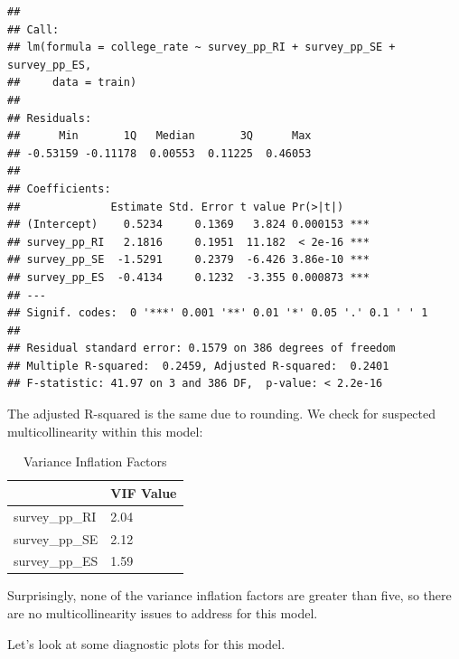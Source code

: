 \documentclass[
  man,floatsintext]{apa6}
\begin{document}
\begin{verbatim}
## 
## Call:
## lm(formula = college_rate ~ survey_pp_RI + survey_pp_SE + survey_pp_ES, 
##     data = train)
## 
## Residuals:
##      Min       1Q   Median       3Q      Max 
## -0.53159 -0.11178  0.00553  0.11225  0.46053 
## 
## Coefficients:
##              Estimate Std. Error t value Pr(>|t|)    
## (Intercept)    0.5234     0.1369   3.824 0.000153 ***
## survey_pp_RI   2.1816     0.1951  11.182  < 2e-16 ***
## survey_pp_SE  -1.5291     0.2379  -6.426 3.86e-10 ***
## survey_pp_ES  -0.4134     0.1232  -3.355 0.000873 ***
## ---
## Signif. codes:  0 '***' 0.001 '**' 0.01 '*' 0.05 '.' 0.1 ' ' 1
## 
## Residual standard error: 0.1579 on 386 degrees of freedom
## Multiple R-squared:  0.2459, Adjusted R-squared:  0.2401 
## F-statistic: 41.97 on 3 and 386 DF,  p-value: < 2.2e-16
\end{verbatim}

The adjusted R-squared is the same due to rounding. We check for suspected multicollinearity within this model:

\begin{table}[H]

\begin{center}
\begin{threeparttable}

\caption{\label{tab:base-rating-model-vif-check}Variance Inflation Factors}

\begin{tabular}{ll}
\toprule
 & \multicolumn{1}{c}{VIF Value}\\
\midrule
survey\_pp\_RI & 2.04\\
survey\_pp\_SE & 2.12\\
survey\_pp\_ES & 1.59\\
\bottomrule
\end{tabular}

\end{threeparttable}
\end{center}

\end{table}

Surprisingly, none of the variance inflation factors are greater than five, so there are no multicollinearity issues to address for this model.

Let's look at some diagnostic plots for this model.
\end{document}

